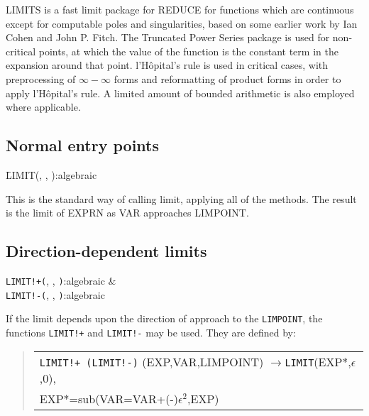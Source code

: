 
LIMITS is a fast limit package for REDUCE for functions which are
continuous except for computable poles and singularities, based on some
earlier work by Ian Cohen and John P. Fitch.  The Truncated Power Series
package is used for non-critical points, at which the value of the
function is the constant term in the expansion around that point.
l'H\^opital's rule is used in critical cases, with preprocessing of
$\infty - \infty$ forms and reformatting of product forms in order
to apply l'H\^opital's rule.  A limited amount of bounded arithmetic
is also employed where applicable.

\subsection{Normal entry points}
\hypertarget{operator:LIMIT}{}
\begin{syntax}
 \f{LIMIT(}, ,
  ):{algebraic}
\end{syntax}

This is the standard way of calling limit, applying all of the methods. The
result is the limit of EXPRN as VAR approaches LIMPOINT.


\subsection{Direction-dependent limits}

 
\hypertarget{operator:LIMIT+}{}
\hypertarget{operator:LIMIT-}{}
\begin{syntaxtable}
  \texttt{LIMIT!+(}, ,
     \texttt{)}:algebraic & \\
  \texttt{LIMIT!-(}, ,
     \texttt{)}:algebraic \\
\end{syntaxtable}

If the limit depends upon the direction of approach to the \texttt{LIMPOINT},
the functions \texttt{LIMIT!+} and \texttt{LIMIT!-} may be used.  They are
defined by:
\begin{quote}
\begin{tabular}{l}
 \texttt{LIMIT!+ (LIMIT!-)} (EXP,VAR,LIMPOINT) $\rightarrow$\texttt{LIMIT}(EXP*,$\epsilon$,0), \\
  \qquad EXP*=sub(VAR=VAR+(-)$\epsilon^2$,EXP)
\end{tabular}
\end{quote}

